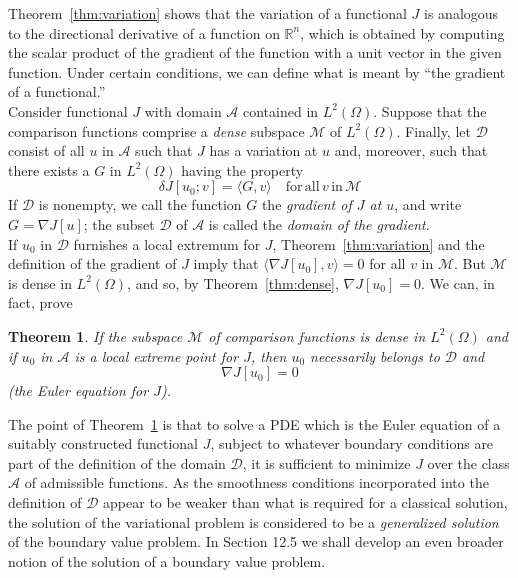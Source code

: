 \documentclass[11pt]{book}
\theoremstyle{example}
\theoremstyle{problem}
\theoremstyle{theorem}
\newtheorem{theorem}{Theorem}[chapter]
\theoremstyle{definition}
\begin{document}
Theorem~\ref{thm:variation} shows that the variation of a functional $J$ is analogous to the directional derivative of a function on $\mathbb{R}^n$, which is obtained by computing the scalar product of the gradient of the function with a unit vector in the given function. Under certain conditions, we can define what is meant by ``the gradient of a functional.''\\
Consider functional $J$ with domain $\mathscr{A}$ contained in $L^2(\Omega)$. Suppose that the comparison functions comprise a \emph{dense} subspace $\mathscr{M}$ of $L^2(\Omega)$. Finally, let $\mathscr{D}$ consist of all $u$ in $\mathscr{A}$ such that $J$ has a variation at $u$ and, moreover, such that there exists a $G$ in $L^2(\Omega)$ having the property
\begin{equation}
	{\delta}J[u_0;v]=\langle{G,v}\rangle\quad\mathrm{for\,all}\,v\,\mathrm{in}\,\mathscr{M}
\end{equation}
If $\mathscr{D}$ is nonempty, we call the function $G$ the \emph{gradient of $J$ at $u$}, and write $G=\mathbb{\nabla}J[u]$; the subset $\mathscr{D}$ of $\mathscr{A}$ is called the \emph{domain of the gradient}.\\
If $u_0$ in $\mathscr{D}$ furnishes a local extremum for $J$, Theorem~\ref{thm:variation} and the definition of the gradient of $J$ imply that $\langle\mathbb{\nabla}J[u_0],v\rangle=0$ for all $v$ in $\mathscr{M}$. But $\mathscr{M}$ is dense in $L^2(\Omega)$, and so, by Theorem~\ref{thm:dense}, $\mathbb{\nabla}J[u_0]=0$. We can, in fact, prove
\begin{theorem}\label{thm:eulereqn}
	If the subspace $\mathscr{M}$ of comparison functions is dense in $L^2(\Omega)$ and if $u_0$ in $\mathscr{A}$ is a local extreme point for $J$, then $u_0$ necessarily belongs to $\mathscr{D}$ and
	\begin{equation}
		\mathbb{\nabla}J[u_0]=0
	\end{equation}
	(the \emph{Euler equation} for $J$).
\end{theorem}
The point of Theorem~\ref{thm:eulereqn} is that to solve a PDE which is the Euler equation of a suitably constructed functional $J$, subject to whatever boundary conditions are part of the definition of the domain $\mathscr{D}$, it is sufficient to minimize $J$ over the class $\mathscr{A}$ of admissible functions. As the smoothness conditions incorporated into the definition of $\mathscr{D}$ appear to be weaker than what is required for a classical solution, the solution of the variational problem is considered to be a \emph{generalized solution} of the boundary value problem. In Section 12.5 we shall develop an even broader notion of the solution of a boundary value problem.
\end{document}
